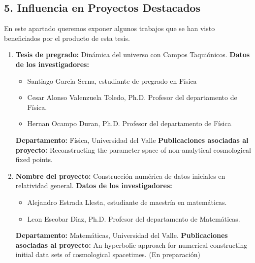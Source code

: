 \begin{spacing}{1.5}
  \begin{tightcenter}
    \section{5. Influencia en Proyectos Destacados}
  \end{tightcenter}

  En este apartado queremos exponer algunos trabajos que se han visto
  beneficiados por el producto de esta tesis.

  \begin{enumerate}

    \item \textbf{Tesis de pregrado:} Dinámica del universo con Campos
          Taquiónicos. \newline
          \textbf{Datos de los investigadores:}
          \begin{itemize}
            \item Santiago Garcia Serna, estudiante de pregrado en Física
            \item Cesar Alonso Valenzuela Toledo, Ph.D. Profesor del
                  departamento de Física.
            \item Hernan Ocampo Duran, Ph.D. Profesor del departamento de
                  Física
          \end{itemize}
          \textbf{Departamento: } Física, Universidad del Valle \newline
          \textbf{Publicaciones asociadas al proyecto: } \newline Reconstructing
          the parameter space of non-analytical cosmological fixed points.\cite{Tesis1}

    \item \textbf{Nombre del proyecto:} Construcción numérica de datos
          iniciales en relatividad general. \newline
          \textbf{Datos de los investigadores:}
          \begin{itemize}
            \item Alejandro Estrada Llesta, estudiante de maestría en
                  matemáticas.
            \item Leon Escobar Diaz, Ph.D. Profesor del departamento de
                  Matemáticas.
          \end{itemize}
          \textbf{Departamento: } Matemáticas, Universidad del Valle. \newline
          \textbf{Publicaciones asociadas al proyecto: } \newline An hyperbolic
          approach for numerical constructing initial data sets of cosmological
          spacetimes. (En preparación)


\end{enumerate}
\end{spacing}
